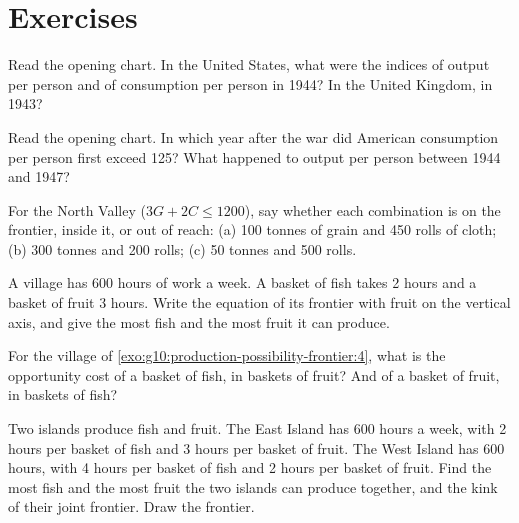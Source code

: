 \section{Exercises}

\begin{exercise}[$\star$]\label{exo:g10:production-possibility-frontier:1}
Read the opening chart. In the United States, what were the indices of output per person and of
consumption per person in 1944? In the United Kingdom, in 1943?
\end{exercise}

\begin{exercise}[$\star$]\label{exo:g10:production-possibility-frontier:2}
Read the opening chart. In which year after the war did American consumption per person first exceed
125? What happened to output per person between 1944 and 1947?
\end{exercise}

\begin{exercise}[$\star$]\label{exo:g10:production-possibility-frontier:3}
For the North Valley ($3G + 2C \le 1200$), say whether each combination is on the frontier, inside it,
or out of reach: (a) 100 tonnes of grain and 450 rolls of cloth; (b) 300 tonnes and 200 rolls; (c) 50
tonnes and 500 rolls.
\end{exercise}

\begin{exercise}[$\star$]\label{exo:g10:production-possibility-frontier:4}
A village has 600 hours of work a week. A basket of fish takes 2 hours and a basket of fruit 3 hours.
Write the equation of its frontier with fruit on the vertical axis, and give the most fish and the most
fruit it can produce.
\end{exercise}

\begin{exercise}[$\star$]\label{exo:g10:production-possibility-frontier:5}
For the village of \cref{exo:g10:production-possibility-frontier:4}, what is the opportunity cost of a
basket of fish, in baskets of fruit? And of a basket of fruit, in baskets of fish?
\end{exercise}

\begin{exercise}[$\star\star$]\label{exo:g10:production-possibility-frontier:6}
Two islands produce fish and fruit. The East Island has 600 hours a week, with 2 hours per basket of
fish and 3 hours per basket of fruit. The West Island has 600 hours, with 4 hours per basket of fish and
2 hours per basket of fruit. Find the most fish and the most fruit the two islands can produce together,
and the kink of their joint frontier. Draw the frontier.
\end{exercise}

